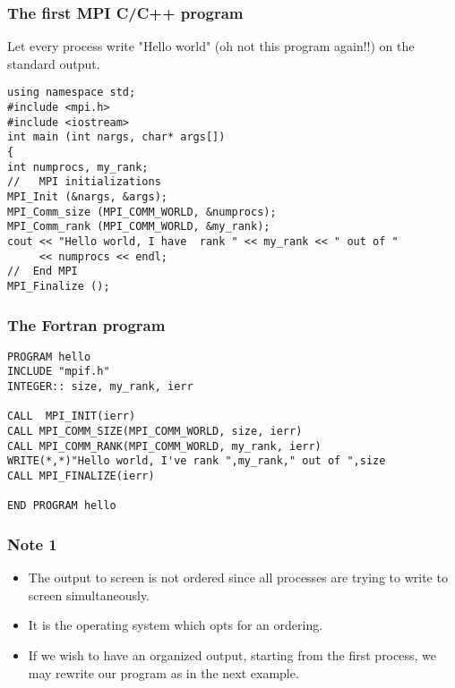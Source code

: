 \documentclass{beamer}
\begin{document}
\begin{frame}
\frametitle{The first MPI C/C++ program}

\begin{block}{}


Let every process write "Hello world" (oh not this program again!!) on the standard output. 
\begin{verbatim}
using namespace std;
#include <mpi.h>
#include <iostream>
int main (int nargs, char* args[])
{
int numprocs, my_rank;
//   MPI initializations
MPI_Init (&nargs, &args);
MPI_Comm_size (MPI_COMM_WORLD, &numprocs);
MPI_Comm_rank (MPI_COMM_WORLD, &my_rank);
cout << "Hello world, I have  rank " << my_rank << " out of " 
     << numprocs << endl;
//  End MPI
MPI_Finalize ();
\end{verbatim}

\end{block}
\end{frame}

\begin{frame}
\frametitle{The Fortran program}

\begin{block}{}
\begin{Verbatim}[numbers=none,fontsize=\fontsize{9pt}{9pt},baselinestretch=0.95]
PROGRAM hello
INCLUDE "mpif.h"
INTEGER:: size, my_rank, ierr

CALL  MPI_INIT(ierr)
CALL MPI_COMM_SIZE(MPI_COMM_WORLD, size, ierr)
CALL MPI_COMM_RANK(MPI_COMM_WORLD, my_rank, ierr)
WRITE(*,*)"Hello world, I've rank ",my_rank," out of ",size
CALL MPI_FINALIZE(ierr)

END PROGRAM hello
\end{Verbatim}


\end{block}
\end{frame}

\begin{frame}
\frametitle{Note 1}

\begin{block}{}

\begin{itemize}
\item The output to screen is not ordered since all processes are trying to write  to screen simultaneously.

\item It is the operating system which opts for an ordering.  

\item If we wish to have an organized output, starting from the first process, we may rewrite our program as in the next example.
\end{itemize}

\noindent
\end{block}
\end{frame}
\end{document}

